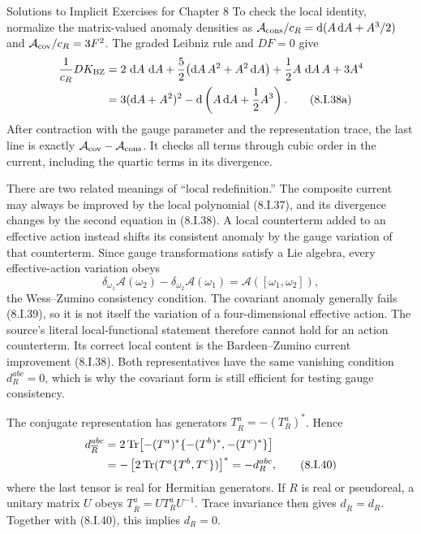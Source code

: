\begin{bankssolutions}{Solutions to Implicit Exercises for Chapter 8}
To check the local identity, normalize the matrix-valued anomaly densities as
$\mathcal A_{\rm cons}/c_R=\mathop{}\!\mathrm{d}(A\mathop{}\!\mathrm{d} A+A^3/2)$ and
$\mathcal A_{\rm cov}/c_R=3F^2$.  The graded Leibniz rule and $DF=0$ give
\begin{align*}
 \frac1{c_R}D K_{\rm BZ}
 ={}&2\,\dd A\,\dd A
 +\frac52\bigl(\dd A\,A^2+A^2\dd A\bigr)
 +\frac12A\,\dd A\,A+3A^4\\
 ={}&3(\dd A+A^2)^2
 -\dd\left(A\dd A+\frac12A^3\right).
 \tag{8.I.38a}
\end{align*}
After contraction with the gauge parameter and the representation trace, the
last line is exactly $\mathcal A_{\rm cov}-\mathcal A_{\rm cons}$.  It checks
all terms through cubic order in the current, including the quartic terms in
its divergence.

There are two related meanings of ``local redefinition.''  The composite
current may always be improved by the local polynomial (8.I.37), and its
divergence changes by the second equation in (8.I.38).  A local counterterm
added to an effective action instead shifts its consistent anomaly by the
gauge variation of that counterterm.  Since gauge transformations satisfy a
Lie algebra, every effective-action variation obeys
\[
 \delta_{\omega_1}\mathcal A(\omega_2)
 -\delta_{\omega_2}\mathcal A(\omega_1)
 =\mathcal A([\omega_1,\omega_2]), \tag{8.I.39}
\]
the Wess--Zumino consistency condition.  The covariant anomaly generally
fails (8.I.39), so it is not itself the variation of a four-dimensional
effective action.  The source's literal local-functional statement therefore
cannot hold for an action counterterm.  Its correct local content is the
Bardeen--Zumino current improvement (8.I.38).  Both representatives have
the same vanishing condition $d_R^{abc}=0$, which is why the covariant form is
still efficient for testing gauge consistency.

The conjugate representation has generators
$T_{\overline R}^a=-(T_R^a)^*$.  Hence
\begin{align*}
 d_{\overline R}^{abc}
 &=2\operatorname{Tr}\!\left[-(T^a)^*
 \{-(T^b)^*,-(T^c)^*\}\right]\\
 &=-\left[2\operatorname{Tr}(T^a\{T^b,T^c\})\right]^*
 =-d_R^{abc}, \tag{8.I.40}
\end{align*}
where the last tensor is real for Hermitian generators.  If $R$ is real or
pseudoreal, a unitary matrix $U$ obeys
$T_{\overline R}^a=UT_R^aU^{-1}$.  Trace invariance then gives
$d_{\overline R}=d_R$.  Together with (8.I.40), this implies $d_R=0$.


\end{bankssolutions}

